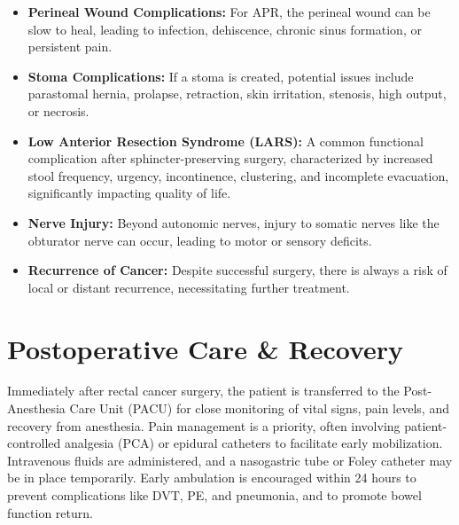 \begin{itemize}
\begin{itemize}
      \item \textbf{Perineal Wound Complications:} For APR, the perineal wound can be slow to heal, leading to infection, dehiscence, chronic sinus formation, or persistent pain.
      
      \item \textbf{Stoma Complications:} If a stoma is created, potential issues include parastomal hernia, prolapse, retraction, skin irritation, stenosis, high output, or necrosis.
      
      \item \textbf{Low Anterior Resection Syndrome (LARS):} A common functional complication after sphincter-preserving surgery, characterized by increased stool frequency, urgency, incontinence, clustering, and incomplete evacuation, significantly impacting quality of life.
      
      \item \textbf{Nerve Injury:} Beyond autonomic nerves, injury to somatic nerves like the obturator nerve can occur, leading to motor or sensory deficits.
      
      \item \textbf{Recurrence of Cancer:} Despite successful surgery, there is always a risk of local or distant recurrence, necessitating further treatment.
    \end{itemize}
\end{itemize}

\section*{Postoperative Care \& Recovery}
Immediately after rectal cancer surgery, the patient is transferred to the Post-Anesthesia Care Unit (PACU) for close monitoring of vital signs, pain levels, and recovery from anesthesia. Pain management is a priority, often involving patient-controlled analgesia (PCA) or epidural catheters to facilitate early mobilization. Intravenous fluids are administered, and a nasogastric tube or Foley catheter may be in place temporarily. Early ambulation is encouraged within 24 hours to prevent complications like DVT, PE, and pneumonia, and to promote bowel function return.

